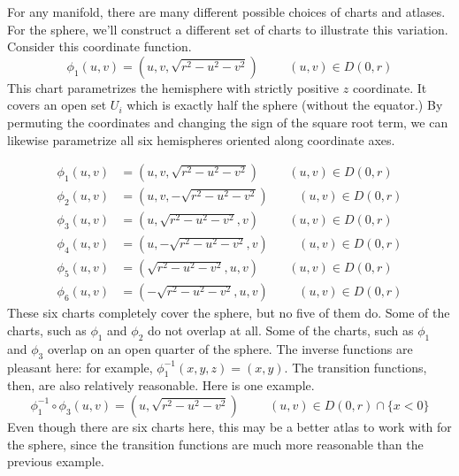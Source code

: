 \documentclass[fleqn,letterpaper]{report}
\begin{document}
\begin{example}
For any manifold, there are many different possible choices of
charts and atlases. For the sphere, we'll construct a
different set of charts to illustrate this variation. Consider
this coordinate function.
\begin{equation*}
\phi_1(u,v) = \left (u,v,\sqrt{r^2-u^2-v^2} \right) \hspace{1cm}
(u,v) \in D(0,r)
\end{equation*}
This chart parametrizes the hemisphere with strictly positive
$z$ coordinate. It covers an open set $U_i$ which is exactly
half the sphere (without the equator.) By permuting the
coordinates and changing the sign of the square root term, we
can likewise parametrize all six hemispheres oriented along
coordinate axes.

\begin{align*}
\phi_1(u,v) & = \left(u,v,\sqrt{r^2-u^2-v^2} \right) \hspace{1cm}
(u,v) \in D(0,r) \\
\phi_2(u,v) & = \left(u,v,-\sqrt{r^2-u^2-v^2} \right) \hspace{1cm}
(u,v) \in D(0,r) \\
\phi_3(u,v) & = \left(u,\sqrt{r^2-u^2-v^2},v \right) \hspace{1cm}
(u,v) \in D(0,r) \\
\phi_4(u,v) & = \left(u,-\sqrt{r^2-u^2-v^2},v \right) \hspace{1cm}
(u,v) \in D(0,r) \\
\phi_5(u,v) & = \left(\sqrt{r^2-u^2-v^2},u,v \right) \hspace{1cm}
(u,v) \in D(0,r) \\
\phi_6(u,v) & = \left(-\sqrt{r^2-u^2-v^2},u,v \right) \hspace{1cm}
(u,v) \in D(0,r) 
\end{align*}
These six charts completely cover the sphere, but no five of
them do. Some of the charts, such as $\phi_1$ and $\phi_2$ do
not overlap at all. Some of the charts, such as $\phi_1$ and
$\phi_3$ overlap on an open quarter of the sphere. The inverse
functions are pleasant here: for example, $\phi_1^{-1}(x,y,z) =
(x,y)$. The transition functions, then, are also relatively
reasonable. Here is one example. 
\begin{equation*}
\phi_1^{-1} \circ \phi_3(u,v) = (u, \sqrt{r^2-u^2-v^2})
\hspace{1cm} (u,v) \in D(0,r) \cap \{ x < 0 \} 
\end{equation*}
Even though there are six charts here, this may be a better
atlas to work with for the sphere, since the transition
functions are much more reasonable than the previous example.
\end{example}
\end{document}
